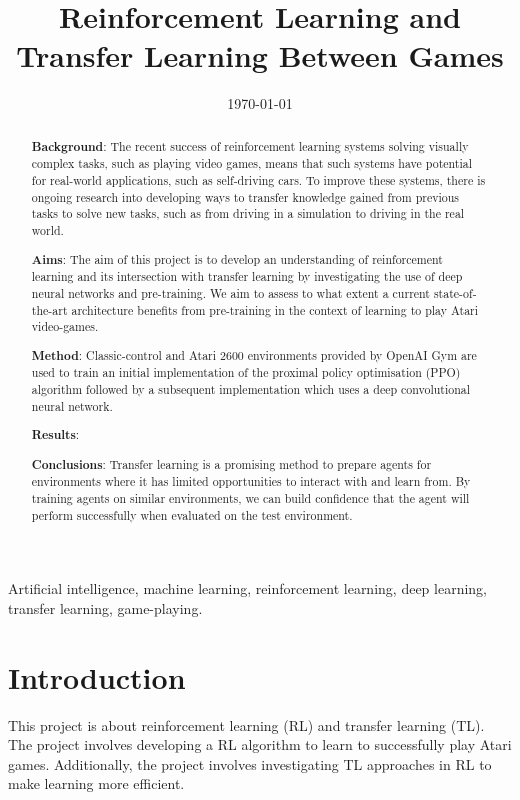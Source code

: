 \documentclass[12pt,a4paper]{article}
\title{Reinforcement Learning and \\ Transfer Learning Between Games}
\author{} %
\date{\today}
\begin{document}
\maketitle

\begin{abstract}
{\bf Background}: The recent success of reinforcement learning systems solving visually complex tasks, such as playing video games, means that such systems have potential for real-world applications, such as self-driving cars. To improve these systems, there is ongoing research into developing ways to transfer knowledge gained from previous tasks to solve new tasks, such as from driving in a simulation to driving in the real world.

{\bf Aims}: The aim of this project is to develop an understanding of reinforcement learning and its intersection with transfer learning by investigating the use of deep neural networks and pre-training. We aim to assess to what extent a current state-of-the-art architecture benefits from pre-training in the context of learning to play Atari video-games.

{\bf Method}: Classic-control and Atari 2600 environments provided by OpenAI Gym are used to train an initial implementation of the proximal policy optimisation (PPO) algorithm followed by a subsequent implementation which uses a deep convolutional neural network.

{\bf Results}: 

{\bf Conclusions}: Transfer learning is a promising method to prepare agents for environments where it has limited opportunities to interact with and learn from. By training agents on similar environments, we can build confidence that the agent will perform successfully when evaluated on the test environment.
\end{abstract}

\begin{keywords}
Artificial intelligence, machine learning, reinforcement learning, deep learning, transfer learning, game-playing.
\end{keywords}

\newpage
\section{Introduction}
This project is about reinforcement learning (RL) and transfer learning (TL). The project involves developing a RL algorithm to learn to successfully play Atari games. Additionally, the project involves investigating TL approaches in RL to make learning more efficient.  
\end{document}
